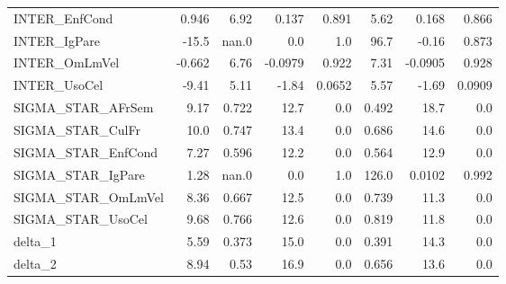 \begin{tabular}{lrrrrrrr}
INTER\_EnfCond      &   0.946 &     6.92 &   0.137 &    0.891 &          5.62 &        0.168 &         0.866 \\
INTER\_IgPare       &   -15.5 &    nan.0 &     0.0 &      1.0 &          96.7 &        -0.16 &         0.873 \\
INTER\_OmLmVel      &  -0.662 &     6.76 & -0.0979 &    0.922 &          7.31 &      -0.0905 &         0.928 \\
INTER\_UsoCel       &   -9.41 &     5.11 &   -1.84 &   0.0652 &          5.57 &        -1.69 &        0.0909 \\
SIGMA\_STAR\_AFrSem  &    9.17 &    0.722 &    12.7 &      0.0 &         0.492 &         18.7 &           0.0 \\
SIGMA\_STAR\_CulFr   &    10.0 &    0.747 &    13.4 &      0.0 &         0.686 &         14.6 &           0.0 \\
SIGMA\_STAR\_EnfCond &    7.27 &    0.596 &    12.2 &      0.0 &         0.564 &         12.9 &           0.0 \\
SIGMA\_STAR\_IgPare  &    1.28 &    nan.0 &     0.0 &      1.0 &         126.0 &       0.0102 &         0.992 \\
SIGMA\_STAR\_OmLmVel &    8.36 &    0.667 &    12.5 &      0.0 &         0.739 &         11.3 &           0.0 \\
SIGMA\_STAR\_UsoCel  &    9.68 &    0.766 &    12.6 &      0.0 &         0.819 &         11.8 &           0.0 \\
delta\_1            &    5.59 &    0.373 &    15.0 &      0.0 &         0.391 &         14.3 &           0.0 \\
delta\_2            &    8.94 &     0.53 &    16.9 &      0.0 &         0.656 &         13.6 &           0.0 \\
\bottomrule
\end{tabular}

